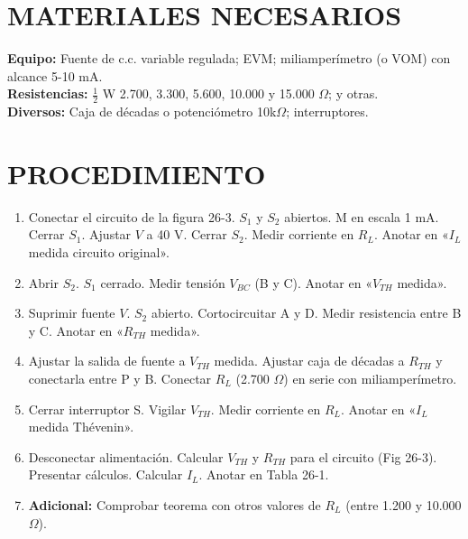 \documentclass[a4paper,12pt]{article}
\begin{document}
\section{MATERIALES NECESARIOS}
\textbf{Equipo:} Fuente de c.c. variable regulada; EVM; miliamperímetro (o VOM) con alcance 5-10 mA. \\
\textbf{Resistencias:} $\frac{1}{2}$ W 2.700, 3.300, 5.600, 10.000 y 15.000 $\Omega$; y otras. \\
\textbf{Diversos:} Caja de décadas o potenciómetro 10k$\Omega$; interruptores.

\section{PROCEDIMIENTO}
\begin{enumerate}
    \item Conectar el circuito de la figura 26-3. $S_1$ y $S_2$ abiertos. M en escala 1 mA. Cerrar $S_1$. Ajustar $V$ a 40 V. Cerrar $S_2$. Medir corriente en $R_L$. Anotar en «$I_L$ medida circuito original».
    
    \item Abrir $S_2$. $S_1$ cerrado. Medir tensión $V_{BC}$ (B y C). Anotar en «$V_{TH}$ medida».
    
    \item Suprimir fuente $V$. $S_2$ abierto. Cortocircuitar A y D. Medir resistencia entre B y C. Anotar en «$R_{TH}$ medida».
    
    \item Ajustar la salida de fuente a $V_{TH}$ medida. Ajustar caja de décadas a $R_{TH}$ y conectarla entre P y B. Conectar $R_L$ (2.700 $\Omega$) en serie con miliamperímetro.
    
    \item Cerrar interruptor S. Vigilar $V_{TH}$. Medir corriente en $R_L$. Anotar en «$I_L$ medida Thévenin».
    
    \item Desconectar alimentación. Calcular $V_{TH}$ y $R_{TH}$ para el circuito (Fig 26-3). Presentar cálculos. Calcular $I_L$. Anotar en Tabla 26-1.
    
    \item \textbf{Adicional:} Comprobar teorema con otros valores de $R_L$ (entre 1.200 y 10.000 $\Omega$).
\end{enumerate}
\end{document}
